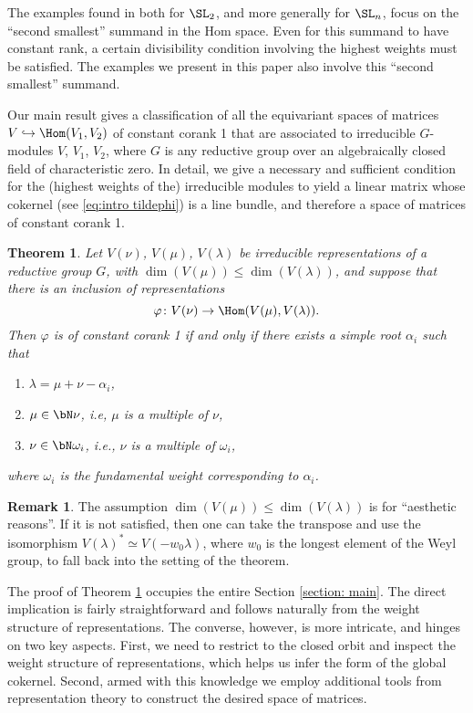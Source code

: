 \documentclass[reqno, 10pt]{amsart}
\theoremstyle{plain}
\newtheorem{theorem}[proposition]{Theorem}
\theoremstyle{definition}
\newtheorem{remark}[proposition]{Remark}
\numberwithin{equation}{section}%
\begin{document}
The examples found in \cite{BFL2} both for $\SL_2$, and more generally for $\SL_n$, focus on the ``second smallest'' summand in the Hom space. Even for this summand to have constant rank, a certain divisibility condition involving the highest weights must be satisfied. The examples we present in this paper also involve this ``second smallest'' summand. 

\smallskip

Our main result gives a classification of all the equivariant spaces of matrices $V\hookrightarrow\Hom(V_1,V_2)$ of constant corank 1 that are associated to irreducible $G$-modules $V$, $V_1$, $V_2$, where $G$ is any reductive group over an algebraically closed field of characteristic zero. 
In detail, we give a necessary and sufficient condition for the (highest weights of the) irreducible modules to yield a linear matrix whose cokernel (see \eqref{eq:intro tildephi}) is a line bundle, and therefore a space of matrices of constant corank 1.

\begin{theorem}\label{T:mainthm-intro}
	Let $V(\nu)$, $V(\mu)$, $V(\lambda)$ be irreducible representations of a reductive group $G$, with $\dim(V(\mu))\le \dim(V(\lambda))$, and suppose that there is an inclusion of representations
	\[ \varphi\colon V(\nu)\to \Hom(V(\mu),V(\lambda)).\]
	Then $\varphi$ is of constant corank 1 if and only if there exists a simple root $\alpha_i$ such that
	\begin{enumerate}
		\item $\lambda = \mu+\nu-\alpha_i$,
		\item $\mu\in \bN\nu$, i.e, $\mu$ is a multiple of $\nu$,
		\item $\nu\in \bN\omega_i$, i.e., $\nu$ is a multiple of $\omega_i$,
	\end{enumerate}
	where $\omega_i$ is the fundamental weight corresponding to $\alpha_i$.
\end{theorem}

\begin{remark}
	The assumption $\dim(V(\mu))\le \dim (V(\lambda))$ is for ``aesthetic reasons''.
	If it is not satisfied, then one can take the transpose and use the isomorphism $V(\lambda)^* \simeq V(-w_0\lambda)$, where $w_0$ is the longest element of the Weyl group, to fall back into the setting of the theorem.
\end{remark}

The proof of Theorem \ref{T:mainthm-intro} occupies the entire Section
\ref{section: main}. The direct implication is fairly straightforward and follows naturally from the weight structure of representations.
The converse, however, is more intricate, and hinges on two key aspects. First, we need to restrict to the closed orbit and inspect the weight structure of representations, which helps us infer the form of the global cokernel. Second, armed with this knowledge we employ additional tools from representation theory to construct the desired space of matrices.
\end{document}
